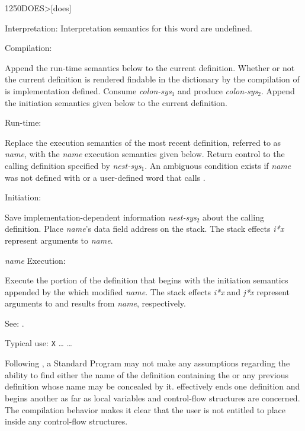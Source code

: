 \begin{newword*}[DOES]{1250}{DOES>}[does]
\item[Interpretation:]
	Interpretation semantics for this word are undefined.

\item[Compilation:]

	Append the run-time semantics below to the current definition.
	Whether or not the current definition is rendered findable in
	the dictionary by the compilation of  is
	implementation defined. Consume \emph{colon-sys}$_1$ and
	produce \emph{colon-sys}$_2$. Append the initiation semantics
	given below to the current definition.

\item[Run-time:]
	\stack{}{}

	Replace the execution semantics of the most recent definition,
	referred to as \emph{name}, with the \emph{name} execution
	semantics given below. Return control to the calling definition
	specified by \emph{nest-sys}$_1$. An ambiguous condition exists
	if \emph{name} was not defined with  or a
	user-defined word that calls .

\item[Initiation:]

	Save implementation-dependent information \emph{nest-sys}$_2$
	about the calling definition. Place \emph{name}'s data field
	address on the stack. The stack effects \emph{i*x} represent
	arguments to \emph{name}.

\item[\emph{name} Execution:]

	Execute the portion of the definition that begins with the
	initiation semantics appended by the  which modified
	\emph{name}. The stack effects \emph{i*x} and \emph{j*x}
	represent arguments to and results from \emph{name},
	respectively.

\item[See:]
	.

	\begin{rationale} %
		Typical use:
			\word{:} \texttt{X} {\ldots}  {\ldots} \word{;}

		Following , a Standard Program may not make any
		assumptions regarding the ability to find either the name of
		the definition containing the  or any previous
		definition whose name may be concealed by it. 
		effectively ends one definition and begins another as far as
		local variables and control-flow structures are concerned.
		The compilation behavior makes it clear that the user is not
		entitled to place  inside any control-flow
		structures.
	\end{rationale}
\end{newword*}


